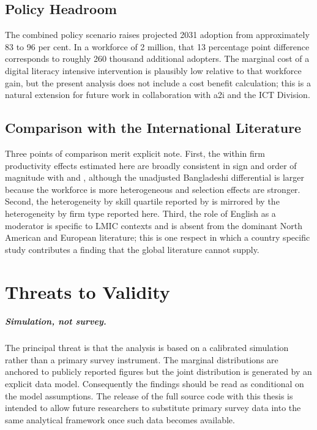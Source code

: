 \documentclass[11pt,a4paper]{report}
\begin{document}
\section{Policy Headroom}

The combined policy scenario raises projected 2031 adoption from
approximately 83 to 96 per cent. In a workforce of 2 million, that 13
percentage point difference corresponds to roughly 260 thousand
additional adopters. The marginal cost of a digital literacy intensive
intervention is plausibly low relative to that workforce gain, but the
present analysis does not include a cost benefit calculation; this is
a natural extension for future work in collaboration with a2i and the
ICT Division.

\section{Comparison with the International Literature}

Three points of comparison merit explicit note. First, the within firm
productivity effects estimated here are broadly consistent in sign and
order of magnitude with \citet{ZieglerEtAl2024} and
\citet{CuiDemirerEtAl2025}, although the unadjusted Bangladeshi
differential is larger because the workforce is more heterogeneous and
selection effects are stronger. Second, the heterogeneity by skill
quartile reported by \citet{BrynjolfssonLiRaymond2025} is mirrored by
the heterogeneity by firm type reported here. Third, the role of
English as a moderator is specific to LMIC contexts and is absent
from the dominant North American and European literature; this is one
respect in which a country specific study contributes a finding that
the global literature cannot supply.

\chapter{Threats to Validity}

\paragraph{Simulation, not survey.}
The principal threat is that the analysis is based on a calibrated
simulation rather than a primary survey instrument. The marginal
distributions are anchored to publicly reported figures but the joint
distribution is generated by an explicit data model. Consequently the
findings should be read as conditional on the model assumptions. The
release of the full source code with this thesis is intended to allow
future researchers to substitute primary survey data into the same
analytical framework once such data becomes available.
\end{document}
